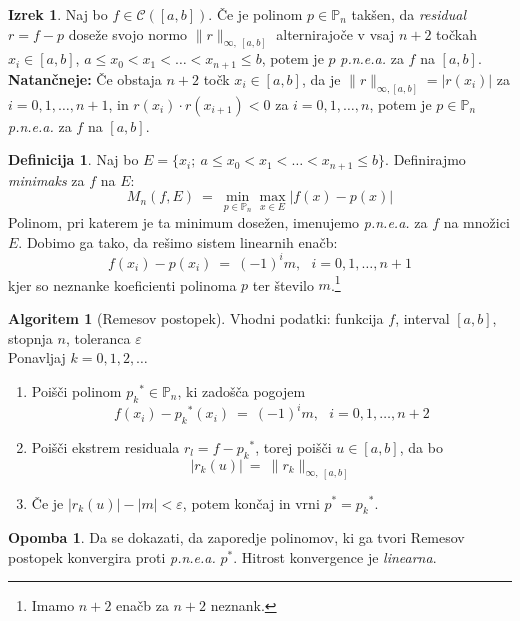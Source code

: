 \documentclass[11pt]{article}
\newcommand{\p}{\mathbb{P}}
\newcommand{\C}{\mathcal{C}}
\theoremstyle{definition}
\newtheorem{definicija}{Definicija}[section]
\theoremstyle{definition}
\newtheorem{izrek}{Izrek}[section]
\newtheorem*{algoritem}{Algoritem}
\newtheorem*{opomba}{Opomba}
\begin{document}
\begin{izrek}

Naj bo $f \in \C([a, b])$. Če je polinom $p \in \p_n$ takšen, da \textit{residual} $r = f - p$ doseže svojo normo $\|r\|_{\infty,~[a, b]}$ alternirajoče v vsaj $n+2$ točkah $x_i \in [a, b]$, $a \leq x_0 < x_1 < \ldots < x_{n+1} \leq b$, potem je $p$ \textit{p.n.e.a.} za $f$ na $[a, b]$. \\

\textbf{Natančneje:} Če obstaja $n+2$ točk $x_i \in [a, b]$, da je $\|r\|_{\infty, [a, b]} = |r(x_i)|$ za $i = 0, 1, \ldots, n+1$, in $r(x_i) \cdot r(x_{i+1}) < 0$ za $i = 0, 1, \ldots, n$, potem je $p \in \p_n$ \textit{p.n.e.a.} za $f$ na $[a, b]$.

\end{izrek}
\vspace{0.5cm}

\begin{definicija}

Naj bo $E = \{x_i;~a \leq x_0 < x_1 < \ldots < x_{n+1} \leq b\}$. Definirajmo \textit{minimaks} za $f$ na $E$:
$$M_n(f, E) ~=~ \min_{p \in \p_n} \max_{x \in E} |f(x) - p(x)|$$
Polinom, pri katerem je ta minimum dosežen, imenujemo \textit{p.n.e.a.} za $f$ na množici $E$. Dobimo ga tako, da rešimo sistem linearnih enačb:
$$f(x_i) - p(x_i) ~=~ (-1)^i m, ~~~i = 0, 1, \ldots, n+1$$
kjer so neznanke koeficienti polinoma $p$ ter število $m$.\footnote{Imamo $n+2$ enačb za $n+2$ neznank.}

\pagebreak

\begin{algoritem}[Remesov postopek]

Vhodni podatki: funkcija $f$, interval $[a, b]$, stopnja $n$, toleranca $\varepsilon$ \\

Ponavljaj $k = 0, 1, 2, \ldots$
\begin{enumerate}
	\item Poišči polinom ${p_k}^* \in \p_n$, ki zadošča pogojem
	$$f(x_i) - {p_k}^*(x_i) ~=~ (-1)^i m, ~~~ i = 0, 1, \ldots, n+2$$
	
	\item Poišči ekstrem residuala $r_l = f - {p_k}^*$, torej poišči $u \in [a, b]$, da bo
	$$|r_k(u)| ~=~ \|r_k\|_{\infty,~[a, b]}$$
	
	\item Če je $|r_k(u)| - |m| < \varepsilon$, potem končaj in vrni $p^* = {p_k}^*$. 
\end{enumerate}
\end{algoritem}
\vspace{0.5cm}

\begin{opomba}

Da se dokazati, da zaporedje polinomov, ki ga tvori Remesov postopek konvergira proti \textit{p.n.e.a.} $p^*$. Hitrost konvergence je \textit{linearna}.

\end{opomba}
\vspace{0.5cm}

\end{definicija}
\vspace{0.5cm}
\end{document}
